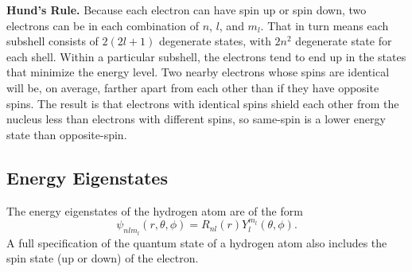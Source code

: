 \documentclass[../../../main.tex]{subfiles}
\begin{document}
\textbf{Hund's Rule.} Because each electron can have spin up or spin down, two electrons can be in each
combination of $n$, $l$, and $m_l$. That in turn means each subshell consists of $2(2l + 1)$ degenerate states, with $2n^2$ degenerate state for each shell. Within a particular subshell, the electrons tend to end up in the states that minimize the energy level. Two nearby electrons whose spins are identical will be, on average, farther apart from each other than if they have opposite spins. The result is that electrons with identical spins shield each other from the nucleus less than electrons with different spins, so same-spin is a lower energy state than opposite-spin.

\subsection{Energy Eigenstates}
The energy eigenstates of the hydrogen atom are of the form
\begin{equation*}
    \psi_{nlm_l} (r,\theta,\phi) = R_{nl}(r)Y^{m_l}_l (\theta,\phi).
\end{equation*}
A full specification of the quantum state of a hydrogen atom also includes the spin state (up or down) of the electron.
\end{document}
